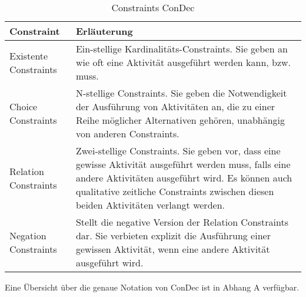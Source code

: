 \begin{table}
\begin{tabular}{|p{}|p{}|}
\hline
\textbf{Constraint} & \textbf{Erläuterung}\\
\hline
Existente Constraints & Ein-stellige Kardinalitäts-Constraints. Sie geben an wie oft eine Aktivität ausgeführt werden kann, bzw. muss.\\
\hline
Choice Constraints & N-stellige Constraints. Sie geben die Notwendigkeit der Ausführung von Aktivitäten an, die zu einer Reihe möglicher Alternativen gehören, unabhängig von anderen Constraints. \\
\hline
Relation Constraints & Zwei-stellige Constraints. Sie geben vor, dass eine gewisse Aktivität ausgeführt werden muss, falls eine andere Aktivitäten ausgeführt wird. Es können auch qualitative zeitliche Constraints zwischen diesen beiden Aktivitäten verlangt werden.\\
\hline
Negation Constraints & Stellt die negative Version der Relation Constraints dar. Sie verbieten explizit die Ausführung einer gewissen Aktivität, wenn eine andere Aktivität ausgeführt wird.\\
\hline
 \end{tabular}
  \caption{Constraints ConDec}
\label{tab:tab3}
 \end{table}
 
 Eine Übersicht über die genaue Notation von ConDec ist in Abhang A verfügbar.
 







